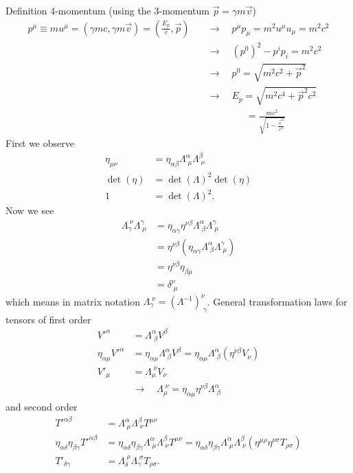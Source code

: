 \documentclass[10pt,a4paper]{book}
\theoremstyle{definition}
\begin{document}
Definition 4-momentum (using the 3-momentum $\vec{p}=\gamma m\vec{v}$)
\begin{align}
    p^\mu \equiv mu^\mu=(\gamma mc,\gamma m\vec{v})=\left(\frac{E_p}{c},\vec{p}\right)\quad&\rightarrow\quad p^\mu p _\mu=m^2u^\mu u_\mu=m^2c^2\\
    &\rightarrow\quad (p^0)^2-p^ip_i=m^2c^2\\
    &\rightarrow\quad p^0=\sqrt{m^2c^2+\vec{p}^2}\\
    &\rightarrow\quad E_p=\sqrt{m^2c^4+\vec{p}^2c^2}\\
    &\qquad\qquad=\frac{mc^2}{\sqrt{1-\frac{\vec{v}^2}{c^2}}}
\end{align}
First we observe
\begin{align}
    \eta_{\mu\nu} &= \eta_{\alpha\beta}\Lambda^\alpha_{\;\mu} \Lambda^\beta_{\;\nu}\\
    \det(\eta)&=\det(\Lambda)^2\det(\eta)\\
    1&=\det(\Lambda)^2.
\end{align}
Now we see
\begin{align}
    \Lambda_\gamma^{\;\nu}\Lambda^\gamma_{\;\mu}&=\eta_{\alpha\gamma}\eta^{\nu\beta}\Lambda^\alpha_{\;\beta} \Lambda^\gamma_{\;\mu}\\
    &=\eta^{\nu\beta}(\eta_{\alpha\gamma}\Lambda^\alpha_{\;\beta} \Lambda^\gamma_{\;\mu})\\
    &=\eta^{\nu\beta}\eta_{\beta\mu}\\
    &=\delta^\nu_{\;\mu}
\end{align}
which means in matrix notation $\Lambda_\gamma^{\;\nu}=(\Lambda^{-1})^\nu_{\;\gamma}$.
General transformation laws for tensors of first order
\begin{align}
    V'^\alpha&=\Lambda^\alpha_{\;\beta}V^\beta\\
    \eta_{\alpha\mu}V'^\alpha&=\eta_{\alpha\mu}\Lambda^\alpha_{\;\beta}V^\beta=\eta_{\alpha\mu}\Lambda^\alpha_{\;\beta}(\eta^{\nu\beta}V_\nu)\\
    V'_\mu&=\Lambda_\mu^{\;\nu}V_\nu\\
    &\rightarrow\quad \Lambda_\mu^{\;\nu} = \eta_{\alpha\mu}\eta^{\nu\beta}\Lambda^\alpha_{\;\beta}
\end{align}
and second order
\begin{align}
    T'^{\alpha\beta}&=\Lambda^\alpha_{\;\mu}\Lambda^\beta_{\;\nu}T^{\mu\nu}\\
    \eta_{\alpha\delta}\eta_{\beta\gamma}T'^{\alpha\beta}&=\eta_{\alpha\delta}\eta_{\beta\gamma}\Lambda^\alpha_{\;\mu}\Lambda^\beta_{\;\nu}T^{\mu\nu}=\eta_{\alpha\delta}\eta_{\beta\gamma}\Lambda^\alpha_{\;\mu}\Lambda^\beta_{\;\nu}(\eta^{\mu\rho}\eta^{\nu\sigma} T_{\rho\sigma})\\
    T'_{\delta\gamma}&=\Lambda_\delta^{\;\rho}\Lambda_\gamma^{\;\sigma}T_{\rho\sigma}.
\end{align}
\end{document}
